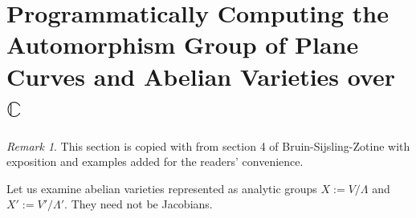 \documentclass[12pt,reqno]{amsart}
\DeclareMathOperator{\Jac}{Jac}
\newcommand{\C}{\mathbb{C}}
\newcommand{\Z}{\mathbb{Z}}
\theoremstyle{definition}
\theoremstyle{remark}
\newtheorem*{remark}{Remark}
\begin{document}



 










\section{Programmatically Computing the Automorphism Group of Plane Curves and Abelian Varieties over $\mathbb{C}$}

\begin{remark} This section is copied with from section 4 of Bruin-Sijsling-Zotine \cite{jeroen} with exposition and examples added for the readers' convenience.\end{remark}

Let us examine abelian varieties represented as analytic groups $X := V/\Lambda$ and $X' := V'/\Lambda'$. They need not be Jacobians.

 
\end{document}
